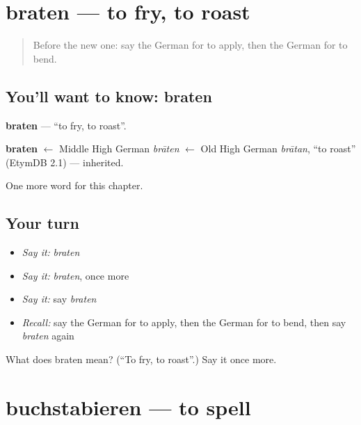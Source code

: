 \section[braten]{braten — to fry, to roast}

\label{lesson:GE-C177-braten}



\begin{quote}
Before the new one: say the German for to apply, then the German for to bend.
\end{quote}

\subsection*{You'll want to know: braten}
\textbf{braten} — \textquotedblleft{}to fry, to roast\textquotedblright{}.

\begin{cousinweb}
\textbf{braten} $\leftarrow$ Middle High German \emph{brāten} $\leftarrow$ Old High German \emph{brātan}, \textquotedblleft{}to roast\textquotedblright{} (EtymDB 2.1) — inherited.
\end{cousinweb}

\begin{grammarlens}[title={What you've built}]
One more word for this chapter.
\end{grammarlens}

\subsection*{Your turn}
\begin{itemize}
\raggedright
  \item \emph{Say it:} \emph{braten}
  \item \emph{Say it:} \emph{braten}, once more
  \item \emph{Say it:} say \emph{braten}
  \item \emph{Recall:} say the German for to apply, then the German for to bend, then say \emph{braten} again
\end{itemize}

\begin{tcolorbox}[breakable,colback=teal!4,colframe=teal!35!black,title={Before you move on}]
What does braten mean? (\textquotedblleft{}To fry, to roast\textquotedblright{}.) Say it once more.
\end{tcolorbox}
\section[buchstabieren]{buchstabieren — to spell}

